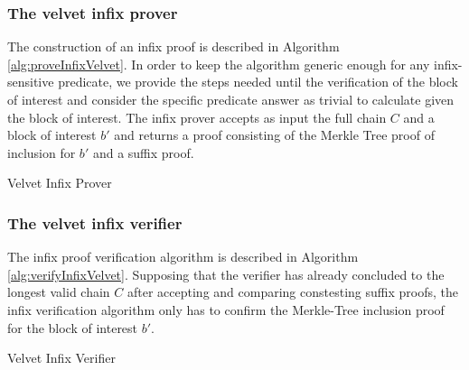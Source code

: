 \documentclass[11pt,a4paper]{article}
\begin{document}
\subsubsection*{The velvet infix prover}
The construction of an infix proof is described in Algorithm \ref{alg:proveInfixVelvet}. In order to keep the algorithm generic enough for any infix-sensitive predicate, we provide the steps needed until the verification of the block of interest and consider the specific predicate answer as trivial to calculate given the block of interest. The infix prover accepts as input the full chain $C$ and a block of interest $b'$ and returns a proof consisting of the Merkle Tree proof of inclusion for $b'$ and a suffix proof.
\vspace{4mm}

\begin{algorithm}[H]
\SetAlgoNoLine
\DontPrintSemicolon
{}
 \caption{Velvet Infix Prover}
 \label{alg:proveInfixVelvet}
\end{algorithm}

\vspace{4mm}

\subsubsection*{The velvet infix verifier}
The infix proof verification algorithm is described in Algorithm \ref{alg:verifyInfixVelvet}.
Supposing that the verifier has already concluded to the longest valid chain $C$ after accepting and comparing constesting suffix proofs, the infix verification algorithm only has to confirm the Merkle-Tree inclusion proof for the block of interest $b'$.

\vspace{4mm}

\begin{algorithm}[H]
\SetAlgoNoLine
\DontPrintSemicolon
{}
 \caption{Velvet Infix Verifier}
 \label{alg:verifyInfixVelvet}
\end{algorithm}

\vspace{4mm}

\end{document}

